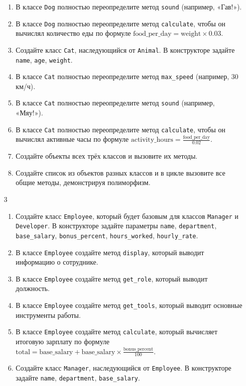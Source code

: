 \begin{enumerate}
\begin{enumerate}
    \item В классе \texttt{Dog} полностью переопределите метод \texttt{sound} (например, «Гав!»).
    \item В классе \texttt{Dog} полностью переопределите метод \texttt{calculate}, чтобы он вычислял количество еды по формуле \( \text{food\_per\_day} = \text{weight} \times 0.03 \).
    \item Создайте класс \texttt{Cat}, наследующийся от \texttt{Animal}. В конструкторе задайте \texttt{name}, \texttt{age}, \texttt{weight}.
    \item В классе \texttt{Cat} полностью переопределите метод \texttt{max\_speed} (например, 30 км/ч).
    \item В классе \texttt{Cat} полностью переопределите метод \texttt{sound} (например, «Мяу!»).
    \item В классе \texttt{Cat} полностью переопределите метод \texttt{calculate}, чтобы он вычислял активные часы по формуле \( \text{activity\_hours} = \frac{\text{food\_per\_day}}{0.02} \).
    \item Создайте объекты всех трёх классов и вызовите их методы.
    \item Создайте список из объектов разных классов и в цикле вызовите все общие методы, демонстрируя полиморфизм.
\end{enumerate}
\item[3]
\begin{enumerate}
    \item Создайте класс \texttt{Employee}, который будет базовым для классов \texttt{Manager} и \texttt{Developer}. В конструкторе задайте параметры \texttt{name}, \texttt{department}, \texttt{base\_salary}, \texttt{bonus\_percent}, \texttt{hours\_worked}, \texttt{hourly\_rate}.
    \item В классе \texttt{Employee} создайте метод \texttt{display}, который выводит информацию о сотруднике.
    \item В классе \texttt{Employee} создайте метод \texttt{get\_role}, который выводит должность.
    \item В классе \texttt{Employee} создайте метод \texttt{get\_tools}, который выводит основные инструменты работы.
    \item В классе \texttt{Employee} создайте метод \texttt{calculate}, который вычисляет итоговую зарплату по формуле \( \text{total} = \text{base\_salary} + \text{base\_salary} \times \frac{\text{bonus\_percent}}{100} \).
    \item Создайте класс \texttt{Manager}, наследующийся от \texttt{Employee}. В конструкторе задайте \texttt{name}, \texttt{department}, \texttt{base\_salary}.

\end{enumerate}
\end{enumerate}
